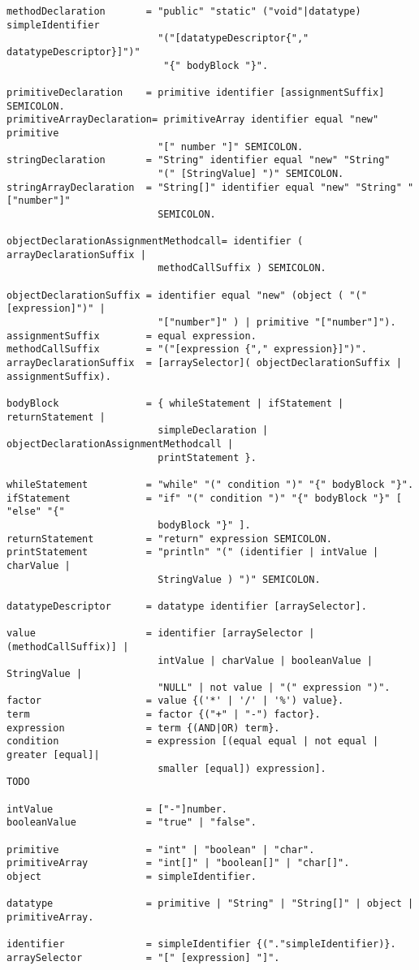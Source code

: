 \begin{verbatim}
methodDeclaration       = "public" "static" ("void"|datatype) simpleIdentifier
                          "("[datatypeDescriptor{"," datatypeDescriptor}]")" 
                           "{" bodyBlock "}".

primitiveDeclaration    = primitive identifier [assignmentSuffix] SEMICOLON.
primitiveArrayDeclaration= primitiveArray identifier equal "new" primitive 
                          "[" number "]" SEMICOLON.
stringDeclaration       = "String" identifier equal "new" "String" 
                          "(" [StringValue] ")" SEMICOLON.
stringArrayDeclaration	= "String[]" identifier equal "new" "String" "["number"]" 
                          SEMICOLON.

objectDeclarationAssignmentMethodcall= identifier ( arrayDeclarationSuffix | 
                          methodCallSuffix ) SEMICOLON.

objectDeclarationSuffix = identifier equal "new" (object ( "("[expression]")" |
                          "["number"]" ) | primitive "["number"]").
assignmentSuffix        = equal expression.
methodCallSuffix        = "("[expression {"," expression}]")".
arrayDeclarationSuffix  = [arraySelector]( objectDeclarationSuffix | assignmentSuffix).
 
bodyBlock               = { whileStatement | ifStatement | returnStatement | 
                          simpleDeclaration | objectDeclarationAssignmentMethodcall | 
                          printStatement }.

whileStatement          = "while" "(" condition ")" "{" bodyBlock "}".
ifStatement             = "if" "(" condition ")" "{" bodyBlock "}" [ "else" "{" 
                          bodyBlock "}" ].
returnStatement         = "return" expression SEMICOLON.
printStatement          = "println" "(" (identifier | intValue | charValue | 
                          StringValue ) ")" SEMICOLON.

datatypeDescriptor      = datatype identifier [arraySelector].

value                   = identifier [arraySelector | (methodCallSuffix)] | 
                          intValue | charValue | booleanValue | StringValue |
                          "NULL" | not value | "(" expression ")".
factor                  = value {('*' | '/' | '%') value}.
term                    = factor {("+" | "-") factor}.
expression              = term {(AND|OR) term}.
condition               = expression [(equal equal | not equal | greater [equal]|
                          smaller [equal]) expression].
TODO

intValue                = ["-"]number.
booleanValue            = "true" | "false".

primitive               = "int" | "boolean" | "char".
primitiveArray          = "int[]" | "boolean[]" | "char[]".
object                  = simpleIdentifier.

datatype                = primitive | "String" | "String[]" | object | primitiveArray.

identifier              = simpleIdentifier {("."simpleIdentifier)}.
arraySelector           = "[" [expression] "]".


\end{verbatim}


